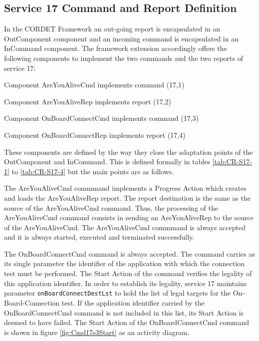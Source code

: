 \documentclass{pnp_article}
\begin{document}
\subsection{Service 17 Command and Report Definition}
In the CORDET Framework an out-going report is encapsulated in an OutComponent component and an incoming command is encapsulated in an InCommand component. The framework extension accordingly offers the following components to implement the two commands and the two reports of service 17:

\begin{fw_itemize}
\item Component AreYouAliveCmd implements command (17,1) 
\item Component AreYouAliveRep implements report (17,2) 
\item Component OnBoardConnectCmd implements command (17,3)  
\item Component OnBoardConnectRep implements report (17,4) 
\end{fw_itemize}

These components are defined by the way they close the adaptation points of the OutComponent and InCommand. This is defined formally in tables \ref{tab:CR-S17-1} to \ref{tab:CR-S17-4} but the main points are as follows.

The AreYouAliveCmd commmand implements a Progress Action which creates and loads the AreYouAliveRep report. The report destination is the same as the source of the AreYouAliveCmd command. Thus, the processing of the AreYouAliveCmd command consists in sending an AreYouAliveRep to the source of the AreYouAliveCmd. The AreYouAliveCmd commmand is always accepted and it is always started, executed and terminated successfully.

The OnBoardConnectCmd command is always accepted. The command carries as its single parameter the identifier of the application with which the connection test must be performed. The Start Action of the command verifies the legality of this application identifier. In order to establish its legality, service 17 maintains parameter \texttt{onBoardConnectDestLst} to hold the list of legal targets for the On-Board-Connection test. If the application identifier carried by the OnBoardConnectCmd command is not included in this list, its Start Action is deemed to have failed. The Start Action of the OnBoardConnectCmd command is shown in figure \ref{fig:Cmd17s3Start} as an activity diagram.
\end{document}
